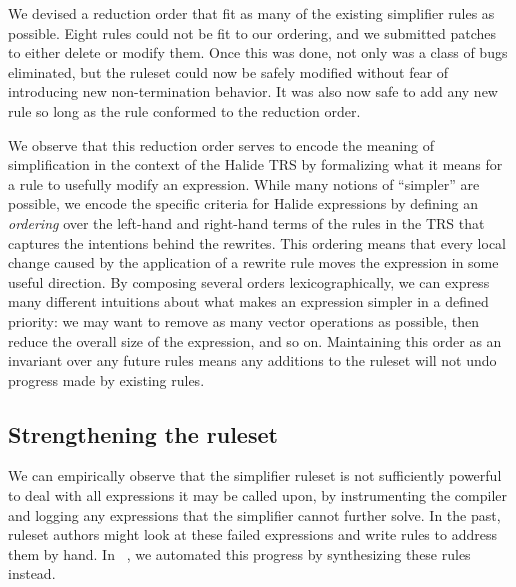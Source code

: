 We devised a reduction order that fit as many of the existing simplifier rules as possible. Eight rules could not be fit to our ordering, and we submitted patches to either delete or modify them. Once this was done, not only was a class of bugs eliminated, but the ruleset could now be safely modified without fear of introducing new non-termination behavior. It was also now safe to add any new rule so long as the rule conformed to the reduction order. 

We observe that this reduction order serves to encode the meaning of simplification in the context of the Halide TRS
by formalizing what it means for a rule to usefully modify an expression.  While
many notions of ``simpler'' are possible, we encode the specific criteria for Halide
expressions by defining an \emph{ordering} over the left-hand and right-hand terms of 
the rules in the TRS that captures the intentions behind the rewrites. This ordering 
means that every local change caused by the application of a rewrite rule moves the 
expression in some useful direction. By composing several orders lexicographically, 
we can express many different intuitions about what makes an expression simpler in a
defined priority: we may want to remove as many vector operations as possible, 
then reduce the overall size of the expression, and so on. Maintaining this order as 
an invariant over any future rules means any additions to the ruleset will not undo 
progress made by existing rules.

\subsection{Strengthening the ruleset}
We can empirically observe that the simplifier ruleset is not sufficiently powerful to deal with all expressions it may be called upon, by instrumenting the compiler and logging any expressions that the simplifier cannot further solve. In the past, ruleset authors might look at these failed expressions and write rules to address them by hand. In ~\cite{newcomb2020verifying}, we automated this progress by synthesizing these rules instead.


